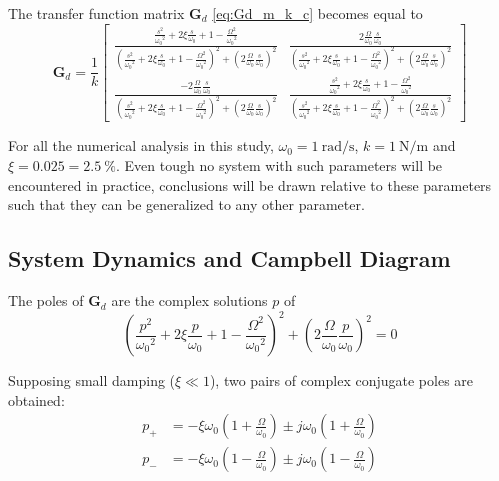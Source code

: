\documentclass{ISMA_USD2020}
\begin{document}
The transfer function matrix \(\bm{G}_d\) \eqref{eq:Gd_m_k_c} becomes equal to
\begin{equation}
\label{eq:Gd_w0_xi_k}
\bm{G}_{d} =
  \frac{1}{k}
  \begin{bmatrix}
    \frac{\frac{s^2}{{\omega_0}^2} + 2 \xi \frac{s}{\omega_0} + 1 - \frac{{\Omega}^2}{{\omega_0}^2}}{\left( \frac{s^2}{{\omega_0}^2} + 2 \xi \frac{s}{\omega_0} + 1 - \frac{{\Omega}^2}{{\omega_0}^2} \right)^2 + \left( 2 \frac{\Omega}{\omega_0} \frac{s}{\omega_0} \right)^2} & \frac{2 \frac{\Omega}{\omega_0} \frac{s}{\omega_0}}{\left( \frac{s^2}{{\omega_0}^2} + 2 \xi \frac{s}{\omega_0} + 1 - \frac{{\Omega}^2}{{\omega_0}^2} \right)^2 + \left( 2 \frac{\Omega}{\omega_0} \frac{s}{\omega_0} \right)^2} \\
    \frac{- 2 \frac{\Omega}{\omega_0} \frac{s}{\omega_0}}{\left( \frac{s^2}{{\omega_0}^2} + 2 \xi \frac{s}{\omega_0} + 1 - \frac{{\Omega}^2}{{\omega_0}^2} \right)^2 + \left( 2 \frac{\Omega}{\omega_0} \frac{s}{\omega_0} \right)^2} & \frac{\frac{s^2}{{\omega_0}^2} + 2 \xi \frac{s}{\omega_0} + 1 - \frac{{\Omega}^2}{{\omega_0}^2}}{\left( \frac{s^2}{{\omega_0}^2} + 2 \xi \frac{s}{\omega_0} + 1 - \frac{{\Omega}^2}{{\omega_0}^2} \right)^2 + \left( 2 \frac{\Omega}{\omega_0} \frac{s}{\omega_0} \right)^2}
  \end{bmatrix}
\end{equation}

For all the numerical analysis in this study, \(\omega_0 = \SI{1}{\radian\per\second}\), \(k = \SI{1}{\newton\per\meter}\) and \(\xi = 0.025 = \SI{2.5}{\percent}\).
Even tough no system with such parameters will be encountered in practice, conclusions will be drawn relative to these parameters such that they can be generalized to any other parameter.

\subsection{System Dynamics and Campbell Diagram}
\label{sec:org20292fd}
The poles of \(\bm{G}_d\) are the complex solutions \(p\) of
\begin{equation}
  \left( \frac{p^2}{{\omega_0}^2} + 2 \xi \frac{p}{\omega_0} + 1 - \frac{{\Omega}^2}{{\omega_0}^2} \right)^2 + \left( 2 \frac{\Omega}{\omega_0} \frac{p}{\omega_0} \right)^2 = 0
\end{equation}

Supposing small damping (\(\xi \ll 1\)), two pairs of complex conjugate poles are obtained:
\begin{subequations}
\label{eq:pole_values}
  \begin{align}
    p_{+} &= - \xi \omega_0 \left( 1 + \frac{\Omega}{\omega_0} \right) \pm j \omega_0 \left( 1 + \frac{\Omega}{\omega_0} \right) \\
    p_{-} &= - \xi \omega_0 \left( 1 - \frac{\Omega}{\omega_0} \right) \pm j \omega_0 \left( 1 - \frac{\Omega}{\omega_0} \right)
  \end{align}
\end{subequations}
\end{document}
